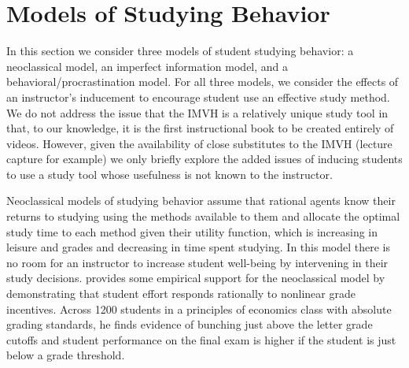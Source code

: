 \documentclass[12pt]{article}
\begin{document}

\section{Models of Studying Behavior}

In this section we consider three models of student studying behavior: a neoclassical model, an imperfect information model, and a behavioral/procrastination model. For all three models, we consider the effects of an instructor's inducement to encourage student use an effective study method. We do not address the issue that the IMVH is a relatively unique study tool in that, to our knowledge, it is the first instructional book to be created entirely of videos. However, given the availability of close substitutes to the IMVH (lecture capture for example) we only briefly explore the added issues of inducing students to use a study tool whose usefulness is not known to the instructor.

Neoclassical models of studying behavior assume that rational agents know their returns to studying using the methods available to them and allocate the optimal study time to each method given their utility function, which is increasing in leisure and grades and decreasing in time spent studying. In this model there is no room for an instructor to increase student well-being by intervening in their study decisions. \textcite{oettinger2002} provides some empirical support for the neoclassical model by demonstrating that student effort responds rationally to nonlinear grade incentives. Across 1200 students in a principles of economics class with absolute grading standards, he finds evidence of bunching just above the letter grade cutoffs and student performance on the final exam is higher if the student is just below a grade threshold.%
\end{document}
